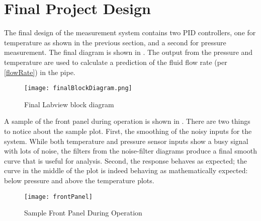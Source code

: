 \documentclass[main.tex]{subfile}
\begin{document}
\section{Final Project Design} 
\label{sec:final_project_design}

The final design of the measurement system contains two PID controllers, one for
temperature as shown in the previous section, and a second for pressure
measurement. The final diagram is shown in . The output
from the pressure and temperature are used to calculate a prediction of the
fluid flow rate (per \eqref{flowRate}) in the pipe.

\begin{figure}[h]
	\begin{center}
		\texttt{[image: finalBlockDiagram.png]}
	\end{center}
	\caption{Final Labview block diagram}
	\label{fig:finalDiagram}
\end{figure}

A sample of the front panel during operation is shown in .
There are two things to notice about the sample plot. First, the smoothing of
the noisy inputs for the system. While both temperature and pressure sensor
inputs show a busy signal with lots of noise, the filters from the noise-filter
diagrams produce a final smooth curve that is useful for analysis. Second, the
response behaves as expected; the curve in the middle of the plot is indeed 
behaving as mathematically expected: below pressure and above the temperature plots.

\begin{figure}[h]
	\begin{center}
		\texttt{[image: frontPanel]}
	\end{center}
	\caption{Sample Front Panel During Operation}
	\label{fig:frontPanel}
\end{figure}

\end{document}

